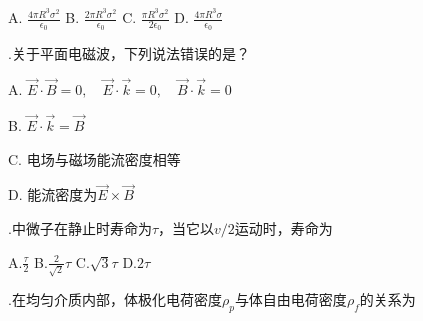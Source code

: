 A.\hspace{0.8em} $\displaystyle{ \frac{4 \pi R^3 \sigma^2}{ \epsilon_0 } }$\hspace{2em} B.\hspace{0.8em} $\displaystyle{ \frac{2 \pi R^3 \sigma^2}{ \epsilon_0 } }$\hspace{2em}
C.\hspace{0.8em} $\displaystyle{ \frac{ \pi R^3 \sigma^2}{ 2 \epsilon_0 } }$\hspace{2em} 
D.\hspace{0.8em} $\displaystyle{ \frac{4 \pi R^3 \sigma}{ \epsilon_0 } }$\hspace{2em} 

\vspace{0.3cm}
.\hspace{0.8em}关于平面电磁波，下列说法错误的是？
\vspace{0.2cm}

A.\hspace{0.8em} $\Vec{E} \cdot \Vec{B} = 0, \quad \Vec{E} \cdot \Vec{k} = 0 , \quad \Vec{B} \cdot \Vec{k} = 0$
\vspace{0.2cm}

B.\hspace{0.8em} $\Vec{E} \cdot \Vec{k} = \Vec{B}$
\vspace{0.2cm}

 
C.\hspace{0.8em} 电场与磁场能流密度相等
\vspace{0.2cm}

D.\hspace{0.8em} 能流密度为$\Vec{E} \times \Vec{B}$
\vspace{0.4cm}

.\hspace{0.8em}中微子在静止时寿命为$\tau$，当它以$v/2$运动时，寿命为
\vspace{0.3cm}

A.\hspace{0.8em}$\displaystyle{ \frac{\tau}{2} }$ \hspace{2em}  
B.\hspace{0.8em}$\displaystyle{ \frac{2}{\sqrt{2}} \tau }$ \hspace{2em}  C.\hspace{0.8em}$\sqrt{3} \tau $ \hspace{2em}  
D.\hspace{0.8em}$2 \tau$
\vspace{0.3cm}

.\hspace{0.8em}在均匀介质内部，体极化电荷密度$\rho_p$与体自由电荷密度$\rho_f$的关系为
\vspace{0.3cm}


